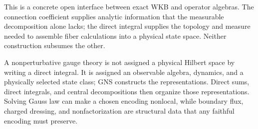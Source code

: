 This is a concrete open interface between exact WKB and operator algebras.
The connection coefficient supplies analytic information that the measurable
decomposition alone lacks; the direct integral supplies the topology and
measure needed to assemble fiber calculations into a physical state space.
Neither construction subsumes the other.

\begin{checkpointbox}
A nonperturbative gauge theory is not assigned a physical Hilbert space by
writing a direct integral.  It is assigned an observable algebra, dynamics,
and a physically selected state class; GNS constructs the representations.
Direct sums, direct integrals, and central decompositions then organize those
representations.  Solving Gauss law can make a chosen encoding nonlocal, while
boundary flux, charged dressing, and nonfactorization are structural data that
any faithful encoding must preserve.
\end{checkpointbox}

